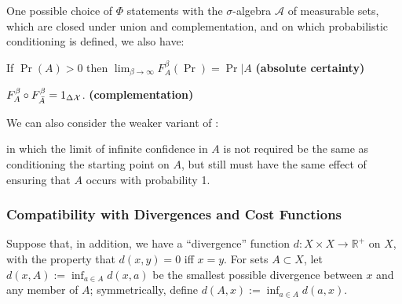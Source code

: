 \documentclass{article}
\DeclareMathOperator{\supp}{\mathrm{Supp}}
\begin{document}
\begin{wip}

One possible choice of $\Phi$ statements with the $\sigma$-algebra $\mathcal A$ of measurable sets, which are closed under union and complementation, and on which probabilistic conditioning is defined, we also have:

\begin{CFaxioms}
    \item If $\Pr(A) > 0$ then $\displaystyle \lim_{\beta\to\infty} F^\beta_A (\Pr) = \Pr|A$
    \hfill \textbf{(absolute certainty)} \label{ax:certainty}


    \item
    $F^\beta_A \circ F_{\bar A}^\beta = 1_{\Delta\mathcal X}$.
        \hfill \textbf{(complementation)} \label{ax:comp}
\end{CFaxioms}


We can also consider the weaker variant of :
in which the limit of infinite confidence in $A$ is not required be the same as conditioning the starting point on $A$, but still must have the same effect of ensuring that $A$ occurs with probability 1.



\subsubsection*{Compatibility with Divergences and Cost Functions}
Suppose that, in addition, we have a ``divergence'' function $d : X \times X \to \mathbb R^+$ on $X$, with the property that $d(x,y) = 0$ iff $x = y$.
For sets $A \subset X$, let $d(x, A) := \inf_{a \in A} d(x,a)$ be the smallest possible divergence between $x$ and any member of $A$; symmetrically, define $d(A, x) := \inf_{a \in A} d(a,x)$.


\end{wip}
\end{document}
